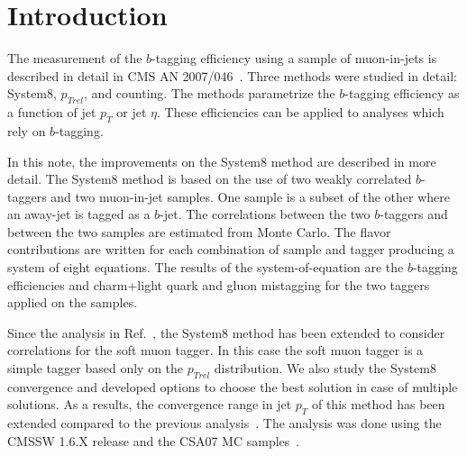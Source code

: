 \section{Introduction}

The measurement of the $b$-tagging efficiency using a sample of muon-in-jets is described
in detail in CMS AN 2007/046~\cite{ref:btag_oldnote}. Three methods were
studied in detail: System8, $p_{Trel}$,
and counting. The methods parametrize the $b$-tagging efficiency  
as a function of jet $p_T$ or jet $\eta$. These efficiencies can be applied to analyses which
rely on $b$-tagging.

In this note, the improvements on the System8 method are described in more detail. The System8 method is based on the use of two weakly correlated
$b$-taggers and two muon-in-jet samples. One sample is a subset of the
other where an away-jet is tagged as a $b$-jet. The correlations
between the two $b$-taggers and between the two samples are estimated
from Monte Carlo. The flavor contributions are written for 
each combination of sample and tagger producing a system of eight
equations. The results of the system-of-equation are the
$b$-tagging efficiencies and charm+light quark and gluon mistagging 
for the two taggers applied on the samples. 

Since the analysis in Ref.~\cite{ref:btag_oldnote}, the System8 method has been extended to consider correlations for the soft
muon tagger. In this case the soft muon tagger is a simple tagger based only on the $p_{Trel}$
distribution. We also study the System8 convergence and developed options to choose the best
solution in case of multiple solutions. As a results, the convergence range in jet $p_T$ of this
method has been extended compared to the previous analysis~\cite{ref:btag_oldnote}. The analysis was done using the CMSSW 1.6.X release and the
CSA07 MC samples~\cite{ref:csa07}.
 
